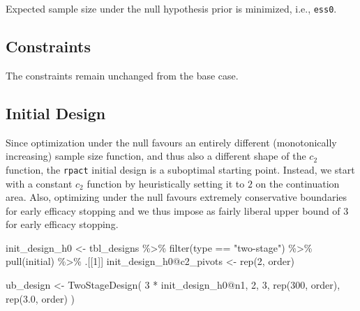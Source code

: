 \documentclass[
]{book}
\newenvironment{Shaded}{\begin{snugshade}}{\end{snugshade}}
\newcommand{\DecValTok}[1]{\textcolor[rgb]{0.00,0.00,0.81}{#1}}
\newcommand{\FloatTok}[1]{\textcolor[rgb]{0.00,0.00,0.81}{#1}}
\newcommand{\FunctionTok}[1]{\textcolor[rgb]{0.00,0.00,0.00}{#1}}
\newcommand{\NormalTok}[1]{#1}
\newcommand{\OtherTok}[1]{\textcolor[rgb]{0.56,0.35,0.01}{#1}}
\newcommand{\SpecialCharTok}[1]{\textcolor[rgb]{0.00,0.00,0.00}{#1}}
\newcommand{\StringTok}[1]{\textcolor[rgb]{0.31,0.60,0.02}{#1}}
\begin{document}
Expected sample size under the null hypothesis prior is minimized,
i.e., \texttt{ess0}.

\hypertarget{constraints-1}{%
\subsection{Constraints}\label{constraints-1}}

The constraints remain unchanged from the base case.

\hypertarget{initial-design}{%
\subsection{Initial Design}\label{initial-design}}

Since optimization under the null favours an entirely different
(monotonically increasing) sample size function,
and thus also a different shape of the \(c_2\) function,
the \texttt{rpact} initial design is a suboptimal starting point.
Instead, we start with a constant \(c_2\) function by heuristically
setting it to \(2\) on the continuation area.
Also, optimizing under the null favours extremely conservative
boundaries for early efficacy stopping and we thus impose as fairly
liberal upper bound of \(3\) for early efficacy stopping.

\begin{Shaded}
\begin{Highlighting}[]
\NormalTok{init\_design\_h0 }\OtherTok{\textless{}{-}}\NormalTok{ tbl\_designs }\SpecialCharTok{\%\textgreater{}\%} 
    \FunctionTok{filter}\NormalTok{(type }\SpecialCharTok{==} \StringTok{"two{-}stage"}\NormalTok{) }\SpecialCharTok{\%\textgreater{}\%} 
    \FunctionTok{pull}\NormalTok{(initial) }\SpecialCharTok{\%\textgreater{}\%} 
\NormalTok{    .[[}\DecValTok{1}\NormalTok{]]}
\NormalTok{init\_design\_h0}\SpecialCharTok{@}\NormalTok{c2\_pivots }\OtherTok{\textless{}{-}} \FunctionTok{rep}\NormalTok{(}\DecValTok{2}\NormalTok{, order)}

\NormalTok{ub\_design }\OtherTok{\textless{}{-}} \FunctionTok{TwoStageDesign}\NormalTok{(}
    \DecValTok{3} \SpecialCharTok{*}\NormalTok{ init\_design\_h0}\SpecialCharTok{@}\NormalTok{n1,}
    \DecValTok{2}\NormalTok{,}
    \DecValTok{3}\NormalTok{,}
    \FunctionTok{rep}\NormalTok{(}\DecValTok{300}\NormalTok{, order),}
    \FunctionTok{rep}\NormalTok{(}\FloatTok{3.0}\NormalTok{, order)}
\NormalTok{)}
\end{Highlighting}
\end{Shaded}
\end{document}
